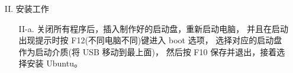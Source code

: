 \begin{itemize}
	\item [II.] 安装工作
		\begin{itemize}
			\item [II-a.] 关闭所有程序后，插入制作好的启动盘，重新启动电脑，
				并且在启动出现提示时按 F12(不同电脑不同)键进入 boot 选项，
				选择对应的启动盘作为启动介质(将 USB 移动到最上面)，
				然后按 F10 保存并退出，接着选择安装 Ubuntu。
				\begin{figure}[htbp]
					\centering
					\hfill
					\label{fig:UbuntuInstall}
				\end{figure}
			

\end{itemize}
\end{itemize}
